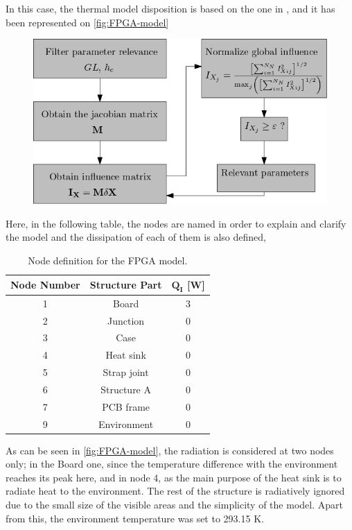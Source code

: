 In this case, the thermal model disposition is based on the one in \cite{amd2024}, and it has been represented on \autoref{fig:FPGA-model} 

\begin{figure}[H]
    \centering
    \includegraphics[width = \textwidth]{Figures/influence_diagram.png}
    \caption{}
    \label{fig:FPGA-model}
\end{figure}

Here, in the following table, the nodes are named in order to explain and clarify the model and the dissipation of each of them is also defined,

\begin{table}[H]
    \centering
    \caption{Node definition for the FPGA model.}
    \label{tab:nodesFPGA}
    \begin{tabular}{c c c}
    \toprule
    \multicolumn{1}{c}{\textbf{Node Number}} & \multicolumn{1}{c}{\textbf{Structure Part}} & \multicolumn{1}{c}{$\boldsymbol{Q_I}$ [W]} \\\midrule
    1 & Board  & 3 \\
    2 & Junction  & 0 \\
    3 & Case  & 0 \\
    4 & Heat sink  & 0 \\
    5 & Strap joint  & 0 \\
    6 & Structure A  & 0 \\
    7 & PCB frame  & 0 \\
    9 & Environment  & 0 \\\bottomrule
    \end{tabular}
    \end{table}

As can be seen in \autoref{fig:FPGA-model}, the radiation is considered at two nodes only; in the Board one, since the temperature difference with the environment reaches its peak here, and in node 4, as the main purpose of the heat sink is to radiate heat to the environment. The rest of the structure is radiatively ignored due to the small size of the visible areas and the simplicity of the model. Apart from this, the environment temperature was set to 293.15 K.

